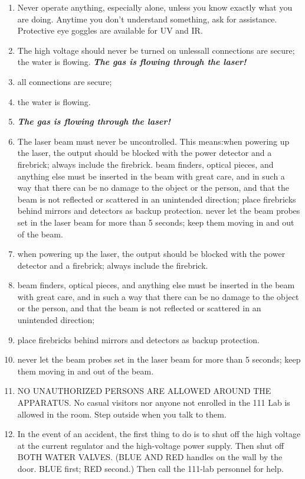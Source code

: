 \documentclass{../lab}
\begin{document}
\begin{enumerate}
    \item Never operate anything, especially alone, unless you know exactly what you are doing. Anytime you don't understand something, ask for assistance. Protective eye goggles are available for UV and IR.
    \item The high voltage should never be turned on unlessall connections are secure;
the water is flowing.
\emph{\textbf{The gas is flowing through the laser!}}
    \item all connections are secure;
    \item the water is flowing.
    \item \emph{\textbf{The gas is flowing through the laser!}}
    \item The laser beam must never be uncontrolled. This means:when powering up the laser, the output should be blocked with the power detector and a firebrick; always include the firebrick.
beam finders, optical pieces, and anything else must be inserted in the beam with great care, and in such a way that there can be no damage to the object or the person, and that the beam is not reflected or scattered in an unintended direction;
place firebricks behind mirrors and detectors as backup protection.
never let the beam probes set in the laser beam for more than 5 seconds; keep them moving in and out of the beam.
    \item when powering up the laser, the output should be blocked with the power detector and a firebrick; always include the firebrick.
    \item beam finders, optical pieces, and anything else must be inserted in the beam with great care, and in such a way that there can be no damage to the object or the person, and that the beam is not reflected or scattered in an unintended direction;
    \item place firebricks behind mirrors and detectors as backup protection.
    \item never let the beam probes set in the laser beam for more than 5 seconds; keep them moving in and out of the beam.
    \item NO UNAUTHORIZED PERSONS ARE ALLOWED AROUND THE APPARATUS. No casual visitors nor anyone not enrolled in the 111 Lab is allowed in the room. Step outside when you talk to them.
    \item In the event of an accident, the first thing to do is to shut off the high voltage at the current regulator and the high-voltage power supply. Then shut off BOTH WATER VALVES. (BLUE AND RED handles on the wall by the door. BLUE first; RED second.) Then call the 111-lab personnel for help.
\end{enumerate}
\end{document}
